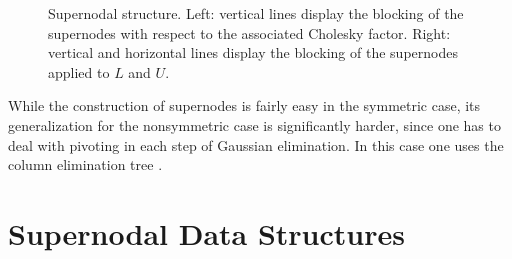 \begin{figure}
\begin{minipage}{.48\textwidth}
\begin{center}
 \end{center}  
\end{minipage}
    \caption{Supernodal structure. Left: vertical lines display the blocking of the
supernodes with respect to the associated Cholesky factor. Right: 
vertical and horizontal lines display the blocking of the
supernodes applied to $L$ and $U$.}
    \label{fig:supernodal_structure}
\end{figure}

While the construction of supernodes is fairly easy in the symmetric case,
its generalization for the nonsymmetric case is significantly harder, since one
has to deal with pivoting in each step of Gaussian elimination.
In this case one uses the column elimination tree \cite{GeoN85}.

\section{Supernodal Data Structures}
\label{sec:parallel}


